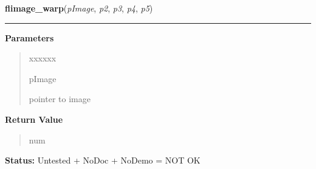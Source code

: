 \hspace{.8\funcindent}\begin{boxedminipage}{\funcwidth}

    \raggedright \textbf{flimage\_warp}(\textit{pImage}, \textit{p2}, \textit{p3}, \textit{p4}, \textit{p5})

    \vspace{-1.5ex}

    \rule{\textwidth}{0.5\fboxrule}
\setlength{\parskip}{2ex}
\setlength{\parskip}{1ex}
      \textbf{Parameters}
      \vspace{-1ex}

      \begin{quote}
        \begin{Ventry}{xxxxxx}

          \item[pImage]

          pointer to image

        \end{Ventry}

      \end{quote}

      \textbf{Return Value}
    \vspace{-1ex}

      \begin{quote}
      num

      \end{quote}

\textbf{Status:} Untested + NoDoc + NoDemo = NOT OK



    \end{boxedminipage}

    \label{xformslib:flflimage:flimage_autocrop}

    \vspace{0.5ex}

